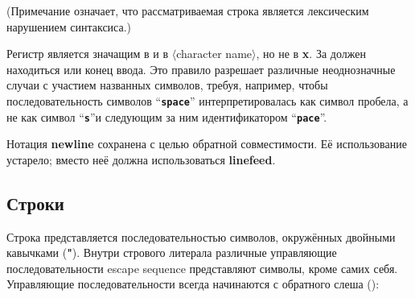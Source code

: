 (Примечание  означает, что рассматриваемая строка является
лексическим нарушением синтаксиса.)

Регистр является значащим в {\bfseries\sharpsign\backwhack} и в
{\bfseries\sharpsign\backwhack} {\rm$\langle$character name$\rangle$}, но не в
{\bfseries\cf\sharpsign\backwhack{}x}. За  должен находиться
 или конец ввода. Это правило разрешает различные неоднозначные случаи с участием
названных символов, требуя, например, чтобы последовательность символов
``{\bfseries\tt\sharpsign\backwhack space}'' интерпретировалась как символ пробела, а не как символ
``{\bfseries\tt\sharpsign\backwhack s}''и следующим за ним идентификатором ``{\bfseries\tt pace}''.

\begin{note}
  Нотация {\bfseries\cf\sharpsign\backwhack{}newline} сохранена с целью обратной совместимости. Её
  использование устарело; вместо неё должна использоваться
  {\bfseries\cf\sharpsign\backwhack{}linefeed}.
\end{note}

\subsection{Строки}

\vest Строка представляется последовательностью символов, окружённых двойными кавычками
({\bfseries\cf "}). Внутри стрового литерала различные управляющие последовательности\mainindex
{escape sequence} представляют символы, кроме самих себя. Управляющие последовательности
всегда начинаются с обратного слеша ({\bfseries\backwhack{}}):


